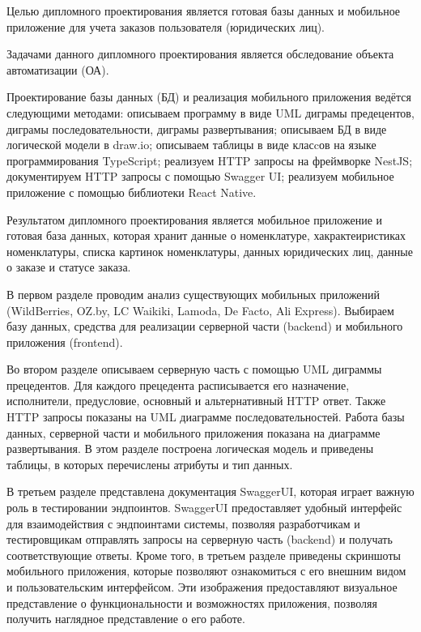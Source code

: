 
Целью дипломного проектирования является готовая базы данных и мобильное приложение
для учета заказов пользователя (юридических лиц).

Задачами данного дипломного проектирования является обследование объекта автоматизации (ОА).

Проектирование базы данных (БД) и реализация мобильного приложения ведётся следующими методами:
описываем программу в виде UML диграмы предецентов, диграмы последовательности, диграмы развертывания;
описываем БД в виде логической модели в draw.io; описываем таблицы в виде класcов на языке программирования TypeScript;
реализуем HTTP запросы на фреймворке NestJS; документируем HTTP запросы с помощью Swagger UI;
реализуем мобильное приложение с помощью библиотеки React Native.

Результатом дипломного проектирования является мобильное приложение и готовая база данных,
которая хранит данные о номенклатуре,
хакрактеиристиках номенклатуры,
списка картинок номенклатуры,
данных юридических лиц,
данные о заказе и статусе заказа.

В первом разделе
проводим анализ существующих мобильных приложений
(WildBerries, OZ.by, LC Waikiki, Lamoda, De Facto, Ali Express).
Выбираем базу данных, средства для реализации серверной части (backend) и мобильного приложения (frontend).

Во втором разделе
описываем серверную часть с помощью UML диграммы прецедентов.
Для каждого прецедента расписывается его назначение, исполнители, предусловие, основный и альтернативный HTTP ответ.
Также HTTP запросы показаны на UML диаграмме последовательностей.
Работа базы данных, серверной части и мобильного приложения показана на диаграмме развертывания.
В этом разделе построена логическая модель и приведены таблицы,
в которых перечислены атрибуты и тип данных.

В третьем разделе
представлена документация SwaggerUI, которая играет важную роль в тестировании эндпоинтов.
SwaggerUI предоставляет удобный интерфейс для взаимодействия с эндпоинтами системы,
позволяя разработчикам и тестировщикам отправлять запросы на серверную часть (backend)
и получать соответствующие ответы.
Кроме того, в третьем разделе приведены скриншоты мобильного приложения,
которые позволяют ознакомиться с его внешним видом и пользовательским интерфейсом.
Эти изображения предоставляют визуальное представление о функциональности и возможностях приложения,
позволяя получить наглядное представление о его работе.

